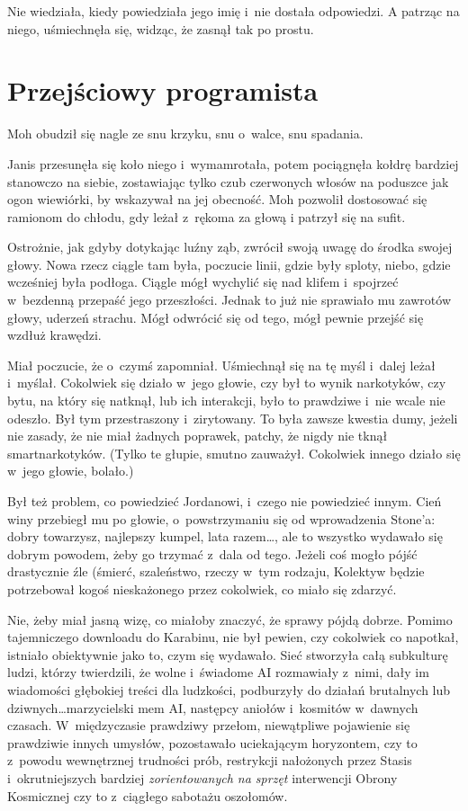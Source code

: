 \documentclass[oneside,polish,11pt,sfheadings]{mwbk}
\begin{document}
Nie wiedziała, kiedy powiedziała jego imię i~nie dostała odpowiedzi. A
patrząc na niego, uśmiechnęła się, widząc, że zasnął tak po prostu.

\chapter{Przejściowy programista}

Moh obudził się nagle ze snu krzyku, snu o~walce, snu spadania.

Janis przesunęła się koło niego i~wymamrotała, potem pociągnęła kołdrę
bardziej stanowczo na siebie, zostawiając tylko czub czerwonych włosów
na poduszce jak ogon wiewiórki, by wskazywał na jej obecność. Moh
pozwolił dostosować się ramionom do chłodu, gdy leżał z~rękoma za głową
i patrzył się na sufit.

Ostrożnie, jak gdyby dotykając luźny ząb, zwrócił swoją uwagę do środka
swojej głowy. Nowa rzecz ciągle tam była, poczucie linii, gdzie były
sploty, niebo, gdzie wcześniej była podłoga. Ciągle mógł wychylić się
nad klifem i~spojrzeć w~bezdenną przepaść jego przeszłości. Jednak to
już nie sprawiało mu zawrotów głowy, uderzeń strachu. Mógł odwrócić się
od tego, mógł pewnie przejść się wzdłuż krawędzi.

Miał poczucie, że o~czymś zapomniał. Uśmiechnął się na tę myśl i~dalej
leżał i~myślał. Cokolwiek się działo w~jego głowie, czy był to wynik
narkotyków, czy bytu, na który się natknął, lub ich interakcji, było to
prawdziwe i~nie wcale nie odeszło. Był tym przestraszony i~zirytowany.
To była zawsze kwestia dumy, jeżeli nie zasady, że nie miał żadnych
poprawek, patchy, że nigdy nie tknął smartnarkotyków. (Tylko te głupie,
smutno zauważył. Cokolwiek innego działo się w~jego głowie, bolało.)

Był też problem, co powiedzieć Jordanowi, i~czego nie powiedzieć innym.
Cień winy przebiegł mu po głowie, o~powstrzymaniu się od wprowadzenia
Stone'a: dobry towarzysz, najlepszy kumpel, lata razem\ldots, ale to
wszystko wydawało się dobrym powodem, żeby go trzymać z~dala od tego.
Jeżeli coś mogło pójść drastycznie źle (śmierć, szaleństwo, rzeczy w~tym
rodzaju, Kolektyw będzie potrzebował kogoś nieskażonego przez cokolwiek,
co miało się zdarzyć.

Nie, żeby miał jasną wizę, co miałoby znaczyć, że sprawy pójdą dobrze.
Pomimo tajemniczego downloadu do Karabinu, nie był pewien, czy cokolwiek
co napotkał, istniało obiektywnie jako to, czym się wydawało. Sieć
stworzyła całą subkulturę ludzi, którzy twierdzili, że wolne i~świadome
AI rozmawiały z~nimi, dały im wiadomości głębokiej treści dla ludzkości,
podburzyły do działań brutalnych lub dziwnych\ldots marzycielski mem AI,
następcy aniołów i~kosmitów w~dawnych czasach. W~międzyczasie prawdziwy
przełom, niewątpliwe pojawienie się prawdziwie innych umysłów,
pozostawało uciekającym horyzontem, czy to z~powodu wewnętrznej
trudności prób, restrykcji nałożonych przez Stasis i~okrutniejszych
bardziej \emph{zorientowanych na sprzęt} interwencji Obrony Kosmicznej
czy to z~ciągłego sabotażu oszołomów.
\end{document}
